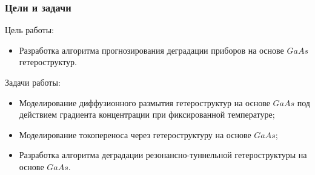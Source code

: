 \documentclass[10pt,pdf,hyperref={unicode},aspectratio={169}]{beamer}
\begin{document}

\begin{frame}
	\frametitle{Цели и задачи}
	\color{blue}
	Цель работы:
	\begin{itemize}
		\item Разработка алгоритма прогнозирования деградации приборов на основе $GaAs$ гетероструктур.
	\end{itemize}
	Задачи работы:
	\begin{itemize}
		\item Моделирование диффузионного размытия гетероструктур на основе $GaAs$ под действием градиента концентрации при фиксированной температуре;
		\item Моделирование токопереноса через гетероструктуру на основе $GaAs$;
		\item Разработка алгоритма деградации резонансно-туннельной гетероструктуры на основе $GaAs$.
	\end{itemize}
\end{frame}
\end{document}
